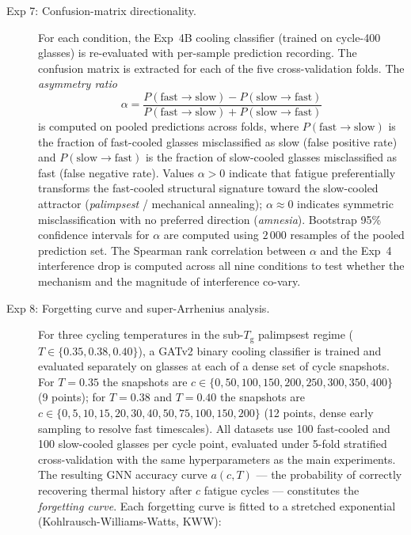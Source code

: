 \documentclass[12pt,a4paper]{article}
\newcommand{\Tg}{T_{\mathrm{g}}}
\begin{document}
\begin{description}
  \item[Exp 7: Confusion-matrix directionality.]
  For each condition, the Exp~4B cooling classifier (trained on cycle-400 glasses) is re-evaluated with per-sample prediction recording.
  The confusion matrix is extracted for each of the five cross-validation folds.
  The \emph{asymmetry ratio}
  \begin{equation}
    \alpha = \frac{P(\text{fast}\to\text{slow}) - P(\text{slow}\to\text{fast})}
                  {P(\text{fast}\to\text{slow}) + P(\text{slow}\to\text{fast})}
    \label{eq:alpha}
  \end{equation}
  is computed on pooled predictions across folds, where $P(\text{fast}\to\text{slow})$ is the fraction of fast-cooled glasses misclassified as slow (false positive rate) and $P(\text{slow}\to\text{fast})$ is the fraction of slow-cooled glasses misclassified as fast (false negative rate).
  Values $\alpha > 0$ indicate that fatigue preferentially transforms the fast-cooled structural signature toward the slow-cooled attractor (\emph{palimpsest} / mechanical annealing);
  $\alpha \approx 0$ indicates symmetric misclassification with no preferred direction (\emph{amnesia}).
  Bootstrap 95\% confidence intervals for $\alpha$ are computed using $2\,000$ resamples of the pooled prediction set.
  The Spearman rank correlation between $\alpha$ and the Exp~4 interference drop is computed across all nine conditions to test whether the mechanism and the magnitude of interference co-vary.
  \item[Exp 8: Forgetting curve and super-Arrhenius analysis.]
  For three cycling temperatures in the sub-$\Tg$ palimpsest regime ($T \in \{0.35, 0.38, 0.40\}$), a GATv2 binary cooling classifier is trained and evaluated separately on glasses at each of a dense set of cycle snapshots.
  For $T = 0.35$ the snapshots are $c \in \{0, 50, 100, 150, 200, 250, 300, 350, 400\}$ (9 points); for $T = 0.38$ and $T = 0.40$ the snapshots are $c \in \{0, 5, 10, 15, 20, 30, 40, 50, 75, 100, 150, 200\}$ (12 points, dense early sampling to resolve fast timescales).
  All datasets use 100 fast-cooled and 100 slow-cooled glasses per cycle point, evaluated under 5-fold stratified cross-validation with the same hyperparameters as the main experiments.
  The resulting GNN accuracy curve $a(c, T)$ — the probability of correctly recovering thermal history after $c$ fatigue cycles — constitutes the \emph{forgetting curve}.
  Each forgetting curve is fitted to a stretched exponential (Kohlrausch-Williams-Watts, KWW):
  \begin{equation}

\end{equation}
\end{description}
\end{document}
